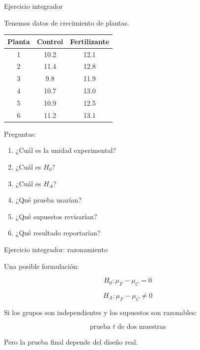 \documentclass[aspectratio=169,11pt]{beamer}
\begin{document}
\begin{frame}{Ejercicio integrador}

Tenemos datos de crecimiento de plantas.

\begin{center}
\begin{tabular}{ccc}
\toprule
Planta & Control & Fertilizante\\
\midrule
1 & 10.2 & 12.1\\
2 & 11.4 & 12.8\\
3 & 9.8 & 11.9\\
4 & 10.7 & 13.0\\
5 & 10.9 & 12.5\\
6 & 11.2 & 13.1\\
\bottomrule
\end{tabular}
\end{center}

Preguntas:

\begin{enumerate}
    \item ¿Cuál es la unidad experimental?
    \item ¿Cuál es $H_0$?
    \item ¿Cuál es $H_A$?
    \item ¿Qué prueba usarían?
    \item ¿Qué supuestos revisarían?
    \item ¿Qué resultado reportarían?
\end{enumerate}

\end{frame}

\begin{frame}{Ejercicio integrador: razonamiento}

Una posible formulación:

\[
H_0:\mu_F-\mu_C=0
\]

\[
H_A:\mu_F-\mu_C\neq0
\]

Si los grupos son independientes y los supuestos son razonables:

\[
\boxed{\text{prueba }t\text{ de dos muestras}}
\]

Pero la prueba final depende del diseño real.

\end{frame}
\end{document}
